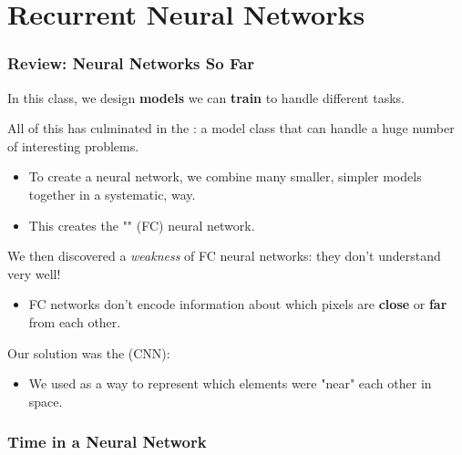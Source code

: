 

\setcounter{chapter}{10-1} %

\chapter{Recurrent Neural Networks}

    \subsection{Review: Neural Networks So Far}

        In this class, we design \textbf{models} we can \textbf{train} to handle different tasks.
        
        All of this has culminated in the : a model class that can handle a huge number of interesting problems.
        
            \begin{itemize}
                \item To create a neural network, we combine many smaller, simpler models together in a systematic,  way.

                \item This creates the "" (FC) neural network.
            \end{itemize}
        
        We then discovered a \textit{weakness} of FC neural networks: they don't understand  very well! 
            \begin{itemize}
                \item \miniex FC networks don't encode information about which pixels are \textbf{close} or \textbf{far} from each other.
            \end{itemize}
            
        Our solution was the  (CNN): 
        \begin{itemize}
            \item We used  as a way to represent which elements were "near" each other in space.
        \end{itemize}
        
    \subsection{Time in a Neural Network}
    
